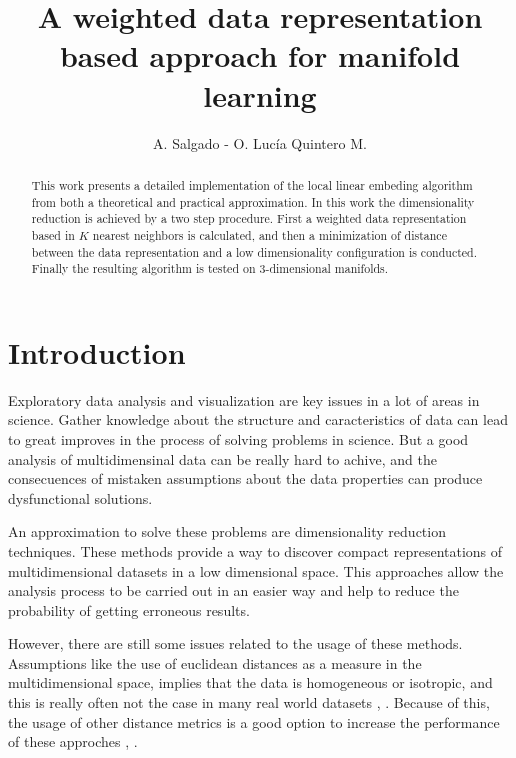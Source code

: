 \documentclass[12pt,journal]{IEEEtran}
\begin{document}
\title{A weighted data representation based approach for manifold learning}
\author{A. Salgado - O. Lucía Quintero M.}
\maketitle

\begin{abstract}
    This work presents a detailed implementation of the local linear embeding algorithm
    from both a theoretical and practical approximation. In this work the
    dimensionality reduction is achieved by a two step procedure. First a
    weighted data representation based in $K$ nearest neighbors is calculated,
    and then a minimization of distance between the data representation and a
    low dimensionality configuration is conducted. Finally the resulting
    algorithm is tested on 3-dimensional manifolds.
\end{abstract}

\section{Introduction}


Exploratory data analysis and visualization are key issues in a lot of areas
in science. Gather knowledge about the structure and caracteristics of data
can lead to great improves in the process of solving problems in science. But a
good analysis of multidimensinal data can be really hard to achive, and the
consecuences of mistaken assumptions about the data properties can produce
dysfunctional solutions.

\vspace{0.25cm}

An approximation to solve these problems are dimensionality reduction techniques.
These methods provide a way to discover compact representations of
multidimensional datasets in a low dimensional space. This approaches allow the
analysis process to be carried out in an easier way and help to reduce the
probability of getting erroneous results.

\vspace{0.25cm}

However, there are still some issues related to the usage of these methods.
Assumptions like the use of euclidean distances as a measure in the
multidimensional space, implies that the data is homogeneous or isotropic, and
this is really often not the case in many real world datasets
\cite{homogeneous1}, \cite{homogeneous2}. Because of this, the usage of other
distance metrics is a good option to increase the performance of these approches
\cite{dist1}, \cite{dist2}.
\end{document}
